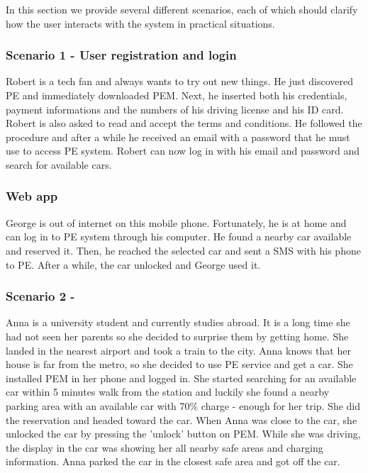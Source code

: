 In this section we provide several different scenarios, each of which should clarify how the user interacts with the system in practical situations.

\subsubsection{Scenario 1 - User registration and login}
Robert is a tech fan and always wants to try out new things. He just discovered PE and immediately downloaded PEM. Next, he inserted both his credentials, payment informations and the numbers of his driving license and his ID card. Robert is also asked to read and accept the terms and conditions. He followed the procedure and after a while he received an email with a password that he must use to access PE system. Robert can now log in with his email and password and search for available cars.

\subsubsection{Web app}
George is out of internet on this mobile phone. Fortunately, he is at home and can log in to PE system through his computer. He found a nearby car available and reserved it. Then, he reached the selected car and sent a SMS with his phone to PE. After a while, the car unlocked and George used it.


\subsubsection{Scenario 2 - }
Anna is a university student and currently studies abroad. It is a long time she had not seen her parents so she decided to surprise them by getting home. She landed in the nearest airport and took a train to the city. Anna knows that her house is far from the metro, so she decided to use PE service and get a car. She installed PEM in her phone and logged in. She started searching for an available car within 5 minutes walk from the station and luckily she found a nearby parking area with an available car with 70\% charge - enough for her trip. She did the reservation and headed toward the car. When Anna was close to the car, she unlocked the car by pressing the 'unlock' button on PEM. While she was driving, the display in the car was showing her all nearby safe areas and charging information. Anna parked the car in the closest safe area and got off the car. 

